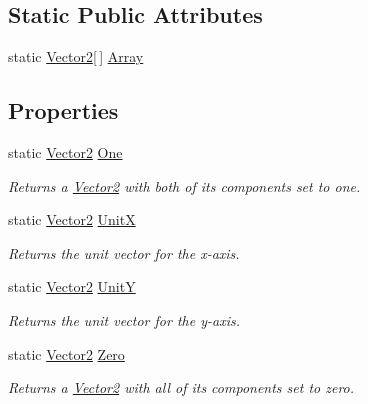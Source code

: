 \subsection*{Static Public Attributes}
\begin{DoxyCompactItemize}
\item 
static \hyperlink{structMicrosoft_1_1Xna_1_1Framework_1_1Vector2}{Vector2}\mbox{[}$\,$\mbox{]} \hyperlink{structMicrosoft_1_1Xna_1_1Framework_1_1Vector2_a329e72a033859659981cb7e3968785a7}{Array}
\end{DoxyCompactItemize}
\subsection*{Properties}
\begin{DoxyCompactItemize}
\item 
static \hyperlink{structMicrosoft_1_1Xna_1_1Framework_1_1Vector2}{Vector2} \hyperlink{structMicrosoft_1_1Xna_1_1Framework_1_1Vector2_ad194eb1e3de0fc1ccc8972c2757fa43e}{One}
\begin{DoxyCompactList}\small\item\em Returns a \hyperlink{structMicrosoft_1_1Xna_1_1Framework_1_1Vector2}{Vector2} with both of its components set to one.\end{DoxyCompactList}\item 
static \hyperlink{structMicrosoft_1_1Xna_1_1Framework_1_1Vector2}{Vector2} \hyperlink{structMicrosoft_1_1Xna_1_1Framework_1_1Vector2_af7076baac701aaeafa0705f59d924b22}{Unit\+X}
\begin{DoxyCompactList}\small\item\em Returns the unit vector for the x-\/axis.\end{DoxyCompactList}\item 
static \hyperlink{structMicrosoft_1_1Xna_1_1Framework_1_1Vector2}{Vector2} \hyperlink{structMicrosoft_1_1Xna_1_1Framework_1_1Vector2_ae7d95a35bbd1615a2ad992b673218a10}{Unit\+Y}
\begin{DoxyCompactList}\small\item\em Returns the unit vector for the y-\/axis.\end{DoxyCompactList}\item 
static \hyperlink{structMicrosoft_1_1Xna_1_1Framework_1_1Vector2}{Vector2} \hyperlink{structMicrosoft_1_1Xna_1_1Framework_1_1Vector2_a9dcabe40c6579fd0521317ba8d6663f3}{Zero}
\begin{DoxyCompactList}\small\item\em Returns a \hyperlink{structMicrosoft_1_1Xna_1_1Framework_1_1Vector2}{Vector2} with all of its components set to zero.\end{DoxyCompactList}\end{DoxyCompactItemize}


